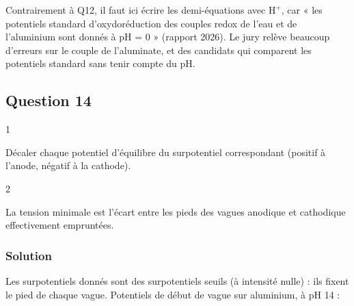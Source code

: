 \documentclass[11pt,a4paper]{article}
\begin{document}
\begin{jury}

Contrairement à Q12, il faut ici écrire les demi-équations avec \(\mathrm{H^+}\), car « les potentiels standard d'oxydoréduction des couples redox de l'eau et de l'aluminium sont donnés à pH = 0 » (rapport 2026). Le jury relève beaucoup d'erreurs sur le couple de l'aluminate, et des candidats qui comparent les potentiels standard sans tenir compte du pH.

\end{jury}

\hypertarget{question-14}{%
\subsection{Question 14}\label{question-14}}

\begin{indication}{1}

Décaler chaque potentiel d'équilibre du surpotentiel correspondant (positif à l'anode, négatif à la cathode).

\end{indication}

\begin{indication}{2}

La tension minimale est l'écart entre les pieds des vagues anodique et cathodique effectivement empruntées.

\end{indication}

\hypertarget{solution-13}{%
\subsubsection{Solution}\label{solution-13}}

Les surpotentiels donnés sont des surpotentiels seuils (à intensité nulle) : ils fixent le pied de chaque vague. Potentiels de début de vague sur aluminium, à pH 14 :
\end{document}
